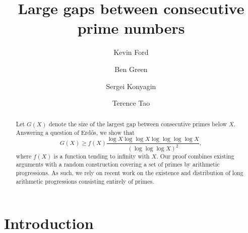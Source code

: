 \documentclass[11pt]{amsart}
\numberwithin{equation}{section}  %
\theoremstyle{remark}
\theoremstyle{plain}
\numberwithin{equation}{section}
\renewcommand{\geq}{\geqslant}
\renewcommand{\(}{\left(}
\renewcommand{\)}{\right)}
\begin{document}
\title{Large gaps between consecutive prime numbers}

\author{Kevin Ford}
\address{Department of Mathematics\\ 1409 West Green Street \\ University
of Illinois at Urbana-Champaign\\ Urbana, IL 61801\\ USA}

\author{Ben Green}
\address{Mathematical Institute\\
Radcliffe Observatory Quarter\\
Woodstock Road\\
Oxford OX2 6GG\\
England }

\author{Sergei Konyagin}
\address{Steklov Mathematical Institute\\
8 Gubkin Street\\
Moscow, 119991\\
Russia}


\author{Terence Tao}
\address{Department of Mathematics, UCLA\\
405 Hilgard Ave\\
Los Angeles CA 90095\\
USA}

\begin{abstract}Let $G(X)$ denote the size of the largest gap between consecutive primes below $X$. Answering a question of Erd\H{o}s, we show that  \[ G(X) \geq f(X) \frac{\log X \log \log X \log \log \log \log X}{(\log \log \log X)^2},\] where $f(X)$ is a function tending to infinity with $X$.  Our proof combines existing arguments with a random construction covering a set of primes by arithmetic progressions.  As such, we rely on recent work on the existence and distribution of long arithmetic progressions consisting entirely of primes.
\end{abstract}

\maketitle

\setcounter{tocdepth}{1}
\tableofcontents



\section{Introduction}
\end{document}
